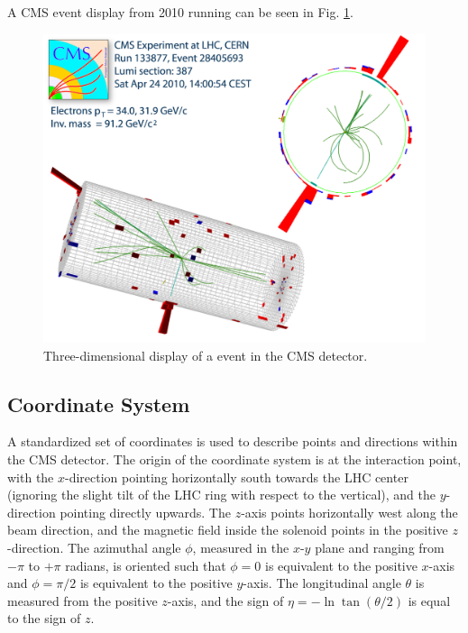 A CMS event display from 2010 running can be seen in Fig. \ref{fig:EventDisplay}.  

 \begin{figure}[htb]
  \begin{center}
    \includegraphics[width=360pt]{Figures/zee-133877-28405693-full.png}
  \end{center}
  \caption[Three-dimensional display of a \Zee event in the CMS detector]{Three-dimensional display of a \Zee event in the CMS detector.}
  \label{fig:EventDisplay}
 \end{figure}

\subsection{Coordinate System} %
A standardized set of coordinates is used to describe points and directions within the CMS detector.  
The origin of the coordinate system is at the interaction point,
with the $x$-direction pointing horizontally south towards the LHC center
(ignoring the slight tilt of the LHC ring with respect to the vertical),
and the $y$-direction pointing directly upwards.  
The $z$-axis points horizontally west along the beam direction,
and the magnetic field inside the solenoid points in the positive $z$-direction.  
The azimuthal angle $\phi$, measured in the $x$-$y$ plane and ranging from $-\pi$ to $+\pi$ radians, 
is oriented such that $ \phi = 0 $ is equivalent to the positive $x$-axis
and $ \phi = \pi/2 $ is equivalent to the positive $y$-axis.  
The longitudinal angle $\theta$ is measured from the positive $z$-axis, 
and the sign of $ \eta = -\ln\tan(\theta/2)$ is equal to the sign of $z$.  


